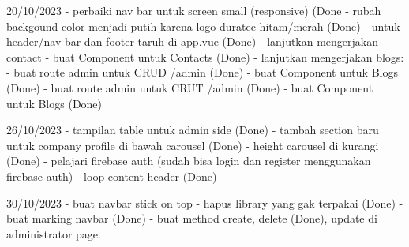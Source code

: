 20/10/2023
    - perbaiki nav bar untuk screen small (responsive) (Done
    - rubah backgound color menjadi putih karena logo duratec hitam/merah (Done)
    - untuk header/nav bar dan footer taruh di app.vue (Done)
    - lanjutkan mengerjakan contact
         - buat Component untuk Contacts (Done)
    - lanjutkan mengerjakan blogs:
        - buat route admin untuk CRUD   /admin (Done)
        - buat Component untuk Blogs (Done)
        - buat route admin untuk CRUT   /admin (Done)
        - buat Component untuk Blogs (Done)
    
26/10/2023
   - tampilan table untuk admin side (Done)
   - tambah section baru untuk company profile di bawah carousel (Done)
   - height carousel di kurangi (Done)
   - pelajari firebase auth (sudah bisa login dan register menggunakan firebase auth)
   - loop content header (Done)

30/10/2023
   - buat navbar stick on top
   - hapus library yang gak terpakai (Done)
   - buat marking navbar (Done)
   - buat method create, delete (Done), update di administrator page.
